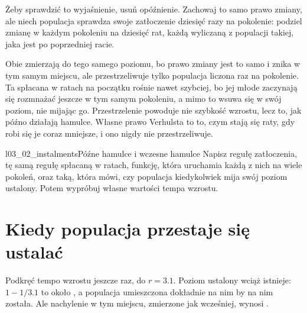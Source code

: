 Żeby sprawdzić to wyjaśnienie, usuń opóźnienie. Zachowaj to samo prawo
zmiany, ale niech populacja sprawdza swoje zatłoczenie dziesięć razy na
pokolenie: podziel zmianę w każdym pokoleniu na dziesięć rat, każdą
wyliczaną z populacji takiej, jaka jest po poprzedniej racie.




\noindent
Obie zmierzają do tego samego poziomu, bo prawo zmiany jest to samo i znika
w tym samym miejscu, ale przestrzeliwuje tylko populacja liczona raz na
pokolenie. Ta spłacana w ratach na początku rośnie nawet szybciej, bo jej
młode zaczynają się rozmnażać jeszcze w tym samym pokoleniu, a mimo to
wsuwa się w swój poziom, nie mijając go. Przestrzelenie powoduje nie
szybkość wzrostu, lecz to, jak późno działają hamulce. Własne prawo
Verhulsta to to, czym stają się raty, gdy robi się je coraz mniejsze, i ono
nigdy nie przestrzeliwuje.


\begin{lab}{l03_02_instalments}{Późne hamulce i wczesne hamulce}
Napisz regułę zatłoczenia, tę samą regułę spłacaną w  ratach,
funkcję, która uruchamia każdą z nich na wiele pokoleń, oraz taką, która
mówi, czy populacja kiedykolwiek mija swój poziom ustalony. Potem wypróbuj
własne wartości tempa wzrostu.
\end{lab}

\section{Kiedy populacja przestaje się ustalać}
\label{sec:ch03-cycle}

\noindent
Podkręć tempo wzrostu jeszcze raz, do $r = \num{3.1}$. Poziom ustalony wciąż
istnieje: $1 - 1/\num{3.1}$ to około , a populacja
umieszczona dokładnie na nim by na nim została. Ale nachylenie w tym
miejscu, zmierzone jak wcześniej, wynosi .

